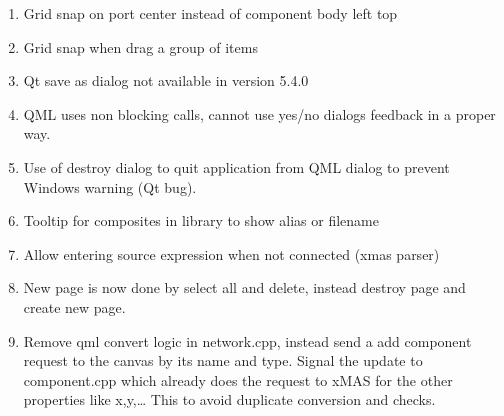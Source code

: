 \begin{enumerate}
\item	Grid snap on port center instead of component body left top
\item	Grid snap when drag a group of items
\item	Qt save as dialog not available in version 5.4.0
\item QML uses non blocking calls, cannot use yes/no dialogs feedback in a
proper way.
\item Use of destroy dialog to quit application from QML dialog to prevent
Windows warning (Qt bug).
\item	Tooltip for composites in library to show alias or filename
\item Allow entering source expression when not connected (xmas parser)
\item New page is now done by select all and delete, instead destroy page and
create new page.
\item Remove qml convert logic in network.cpp, instead send a add component
request to the canvas by its name and type. Signal the update to component.cpp
which already does the request to xMAS for the other properties like x,y,… This
to avoid duplicate conversion and checks.
\end{enumerate}
